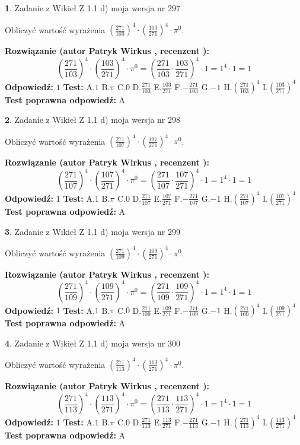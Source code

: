 \documentclass[12pt, a4paper]{article}
\theoremstyle{definition} %
\newtheorem{zad}{}
\newcommand{\zadStart}[1]{\begin{zad}#1\newline}
\newcommand{\zadStop}{\end{zad}}
\newcommand{\rozwStart}[2]{\noindent \textbf{Rozwiązanie (autor #1 , recenzent #2): }\newline}
\newcommand{\rozwStop}{\newline}
\newcommand{\odpStart}{\noindent \textbf{Odpowiedź:}\newline}
\newcommand{\odpStop}{\newline}
\newcommand{\testStart}{\noindent \textbf{Test:}\newline}
\newcommand{\testStop}{\newline}
\newcommand{\kluczStart}{\noindent \textbf{Test poprawna odpowiedź:}\newline}
\newcommand{\kluczStop}{\newline}
\begin{document}
\zadStart{Zadanie z Wikieł Z 1.1 d) moja wersja nr 297}

Obliczyć wartość wyrażenia $(\frac{271}{103})^{4} \cdot (\frac{103}{271})^{4} \cdot \pi^{0}$.
\zadStop
\rozwStart{Patryk Wirkus}{}
$$(\frac{271}{103})^{4} \cdot (\frac{103}{271})^{4} \cdot \pi^{0} = (\frac{271}{103} \cdot \frac{103}{271})^{4} \cdot 1 = 1^{4} \cdot 1 = 1$$
\rozwStop
\odpStart
$1$
\odpStop
\testStart
A.$1$ B.$\pi$ C.$0$ D.$\frac{271}{103}$ E.$\frac{103}{271}$
F.$-\frac{271}{103}$ G.$-1$
H.$(\frac{271}{103})^{4}$
I.$(\frac{103}{271})^{4}$
\testStop
\kluczStart
A
\kluczStop



\zadStart{Zadanie z Wikieł Z 1.1 d) moja wersja nr 298}

Obliczyć wartość wyrażenia $(\frac{271}{107})^{4} \cdot (\frac{107}{271})^{4} \cdot \pi^{0}$.
\zadStop
\rozwStart{Patryk Wirkus}{}
$$(\frac{271}{107})^{4} \cdot (\frac{107}{271})^{4} \cdot \pi^{0} = (\frac{271}{107} \cdot \frac{107}{271})^{4} \cdot 1 = 1^{4} \cdot 1 = 1$$
\rozwStop
\odpStart
$1$
\odpStop
\testStart
A.$1$ B.$\pi$ C.$0$ D.$\frac{271}{107}$ E.$\frac{107}{271}$
F.$-\frac{271}{107}$ G.$-1$
H.$(\frac{271}{107})^{4}$
I.$(\frac{107}{271})^{4}$
\testStop
\kluczStart
A
\kluczStop



\zadStart{Zadanie z Wikieł Z 1.1 d) moja wersja nr 299}

Obliczyć wartość wyrażenia $(\frac{271}{109})^{4} \cdot (\frac{109}{271})^{4} \cdot \pi^{0}$.
\zadStop
\rozwStart{Patryk Wirkus}{}
$$(\frac{271}{109})^{4} \cdot (\frac{109}{271})^{4} \cdot \pi^{0} = (\frac{271}{109} \cdot \frac{109}{271})^{4} \cdot 1 = 1^{4} \cdot 1 = 1$$
\rozwStop
\odpStart
$1$
\odpStop
\testStart
A.$1$ B.$\pi$ C.$0$ D.$\frac{271}{109}$ E.$\frac{109}{271}$
F.$-\frac{271}{109}$ G.$-1$
H.$(\frac{271}{109})^{4}$
I.$(\frac{109}{271})^{4}$
\testStop
\kluczStart
A
\kluczStop



\zadStart{Zadanie z Wikieł Z 1.1 d) moja wersja nr 300}

Obliczyć wartość wyrażenia $(\frac{271}{113})^{4} \cdot (\frac{113}{271})^{4} \cdot \pi^{0}$.
\zadStop
\rozwStart{Patryk Wirkus}{}
$$(\frac{271}{113})^{4} \cdot (\frac{113}{271})^{4} \cdot \pi^{0} = (\frac{271}{113} \cdot \frac{113}{271})^{4} \cdot 1 = 1^{4} \cdot 1 = 1$$
\rozwStop
\odpStart
$1$
\odpStop
\testStart
A.$1$ B.$\pi$ C.$0$ D.$\frac{271}{113}$ E.$\frac{113}{271}$
F.$-\frac{271}{113}$ G.$-1$
H.$(\frac{271}{113})^{4}$
I.$(\frac{113}{271})^{4}$
\testStop
\kluczStart
A
\kluczStop
\end{document}

